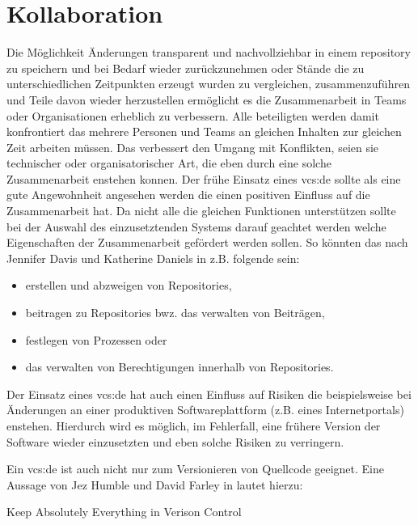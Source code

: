 \section{Kollaboration}
Die Möglichkeit Änderungen transparent und nachvollziehbar in einem
\gls{repository} zu speichern und bei Bedarf wieder zurückzunehmen oder Stände
die zu unterschiedlichen Zeitpunkten erzeugt wurden zu vergleichen,
zusammenzuführen  und Teile davon wieder herzustellen ermöglicht es die
Zusammenarbeit in Teams oder Organisationen erheblich zu verbessern. Alle
beteiligten werden damit konfrontiert das mehrere Personen und Teams an
gleichen Inhalten zur gleichen Zeit arbeiten müssen. Das verbessert den Umgang
mit Konflikten, seien sie technischer oder organisatorischer Art, die eben
durch eine solche Zusammenarbeit enstehen konnen. Der frühe Einsatz eines
\acrlong{vcs:de} sollte als eine gute Angewohnheit angesehen werden die einen
positiven Einfluss auf die Zusammenarbeit hat. Da nicht alle die gleichen
Funktionen unterstützen sollte bei der Auswahl des einzusetztenden
Systems darauf geachtet werden welche Eigenschaften der Zusammenarbeit
gefördert werden sollen. So könnten das nach Jennifer Davis und Katherine
Daniels in \cite[S.~178]{effdo} z.B. folgende sein:

\begin{itemize}
\item erstellen und abzweigen von Repositories,
\item beitragen zu Repositories bwz. das verwalten von Beiträgen,
\item festlegen von Prozessen oder
\item das verwalten von Berechtigungen innerhalb von Repositories.
\end{itemize}

Der Einsatz eines \acrlong{vcs:de} hat auch einen Einfluss auf Risiken die
beispielsweise bei Änderungen an einer produktiven Softwareplattform (z.B.
eines Internetportals) enstehen. Hierdurch wird es möglich, im Fehlerfall, eine
frühere Version der Software wieder einzusetzten und eben solche Risiken zu
verringern.\cite[S.~178]{effdo}

Ein \acrlong{vcs:de} ist auch nicht nur zum Versionieren von Quellcode
geeignet. Eine Aussage von Jez Humble und David Farley in \cite[S.~33]{cd}
lautet hierzu:

\begin{center}
\glqq{}Keep Absolutely Everything in Verison Control\grqq{}
\end{center}

